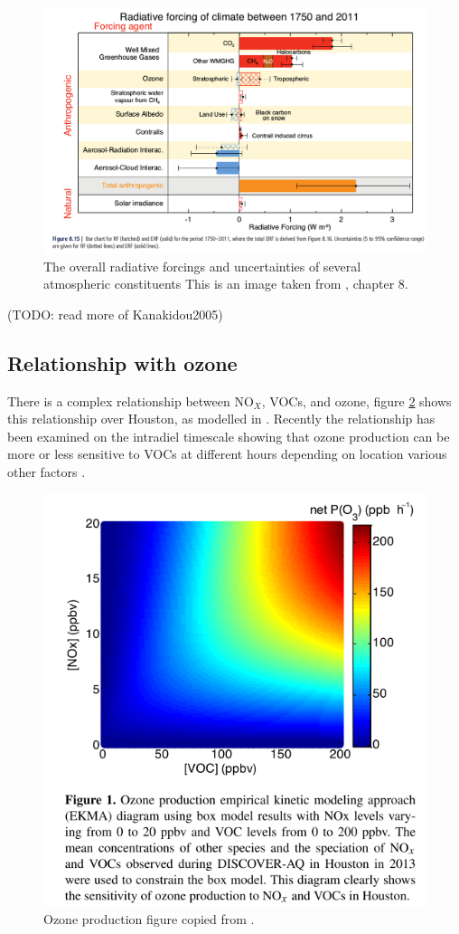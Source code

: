     \begin{figure}
      \includegraphics{Figures/IPCC_WG1AR5_RFSummary.png}
      \caption{%
        The overall radiative forcings and uncertainties of several atmospheric constituents
	      This is an image taken from \cite{IPCC_AR5_WG1}, chapter 8.}
      \label{ch_LitRev:fig:IPCC_RF_AR4}
    \end{figure}    
    
    (TODO: read more of Kanakidou2005)
  \subsection{Relationship with ozone}
    There is a complex relationship between NO$_X$, VOCs, and ozone, figure \ref{ch_LitRev:fig:NOXVOCOzone} shows this relationship over Houston, as modelled in \cite{Mazzuca2016}.
    Recently the relationship has been examined on the intradiel timescale showing that ozone production can be more or less sensitive to VOCs at different hours depending on location various other factors \citep{Mazzuca2016}.
    
    \begin{figure}
      \includegraphics[width=.75\textwidth]{Figures/Mazzuca2016_NOxVOCOzone.png}
      \caption{Ozone production figure copied from \citet{Mazzuca2016}.}
      \label{ch_LitRev:fig:NOXVOCOzone}
    \end{figure}
    

